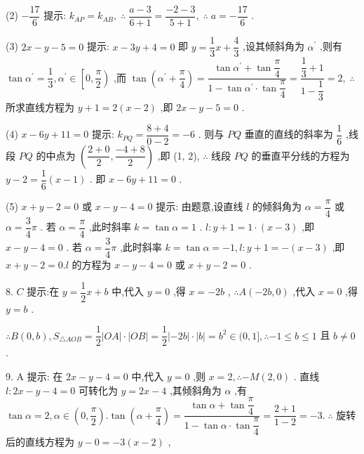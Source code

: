 (2) $- \dfrac{17}{6}$ 提示: ${k}_{AP} = {k}_{AB},\;\therefore \;\dfrac{a - 3}{6 + 1} = \dfrac{-2 - 3}{5 + 1},\;\therefore \;a =  - \dfrac{17}{6}$ .

(3) ${2x} - y - 5 = 0$ 提示: $x - {3y} + 4 = 0$ 即 $y = \dfrac{1}{3}x + \dfrac{4}{3}$ ,设其倾斜角为 ${\alpha }^{\prime }$ ,则有 $\tan {\alpha }^{\prime } = \dfrac{1}{3},{\alpha }^{\prime } \in  \left\lbrack  {0,\dfrac{\pi }{2}}\right)$ ,而 $\tan \left( {{\alpha }^{\prime } + \dfrac{\pi }{4}}\right)  = \dfrac{\tan {\alpha }^{\prime } + \tan \dfrac{\pi }{4}}{1 - \tan {\alpha }^{\prime } \cdot  \tan \dfrac{\pi }{4}} = \dfrac{\dfrac{1}{3} + 1}{1 - \dfrac{1}{3}} = 2,\;\therefore \;$ 所求直线方程为 $y + 1 = 2\left( {x - 2}\right)$ ,即 ${2x} - y - 5 = 0$ .

(4) $x - {6y} + {11} = 0$ 提示: ${k}_{PQ} = \dfrac{8 + 4}{0 - 2} =  - 6$ . 则与 ${PQ}$ 垂直的直线的斜率为 $\dfrac{1}{6}$ ,线段 ${PQ}$ 的中点为 $\left( {\dfrac{2 + 0}{2},\dfrac{-4 + 8}{2}}\right)$ ,即 (1, 2), $\therefore$ 线段 ${PQ}$ 的垂直平分线的方程为 $y - 2 = \dfrac{1}{6}\left( {x - 1}\right)$ . 即 $x - {6y} + {11} = 0$ .

(5) $x + y - 2 = 0$ 或 $x - y - 4 = 0$ 提示: 由题意,设直线 $l$ 的倾斜角为 $\alpha  = \dfrac{\pi }{4}$ 或 $\alpha  = \dfrac{3}{4}\pi$ . 若 $\alpha  = \dfrac{\pi }{4}$ ,此时斜率 $k = \tan \alpha  = 1$ . $l : y + 1 = 1 \cdot  \left( {x - 3}\right)$ ,即 $x - y - 4 = 0$ . 若 $\alpha  = \dfrac{3}{4}\pi$ ,此时斜率 $k = \tan \alpha  =  - 1,l : y + 1 =  - \left( {x - 3}\right)$ ,即 $x + y - 2 = 0.l$ 的方程为 $x - y - 4 = 0$ 或 $x + y - 2 = 0$ .

8. $C$ 提示:在 $y = \dfrac{1}{2}x + b$ 中,代入 $y = 0$ ,得 $x =  - {2b}$ , $\therefore A\left( {-{2b},0}\right)$ ,代入 $x = 0$ ,得 $y = b$ .

$\therefore B\left( {0,b}\right) ,{S}_{\bigtriangleup {AOB}} = \dfrac{1}{2}\left| {OA}\right|  \cdot  \left| {OB}\right|  = \dfrac{1}{2}\left| {-{2b}}\right|  \cdot  \left| b\right|  = {b}^{2} \in  (0,1\rbrack ,\therefore  - 1 \leq  b \leq  1$ 且 $b \neq  0$ .

9. A 提示: 在 ${2x} - y - 4 = 0$ 中,代入 $y = 0$ ,则 $x = 2,\therefore  - M\left( {2,0}\right)$ . 直线 $l : {2x} - y - 4 = 0$ 可转化为 $y = {2x} - 4$ ,其倾斜角为 $\alpha$ ,有 $\tan \alpha  = 2,\alpha  \in  \left( {0,\dfrac{\pi }{2}}\right) .\tan \left( {\alpha  + \dfrac{\pi }{4}}\right)  = \dfrac{\tan \alpha  + \tan \dfrac{\pi }{4}}{1 - \tan \alpha  \cdot  \tan \dfrac{\pi }{4}} = \dfrac{2 + 1}{1 - 2} =  - 3.\;\therefore$ 旋转后的直线方程为 $y - 0 =  - 3\left( {x - 2}\right)$ ,

